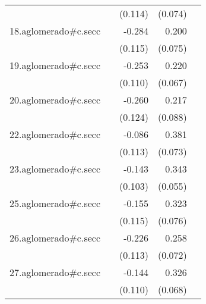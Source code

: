{\begin{longtable}{l*{4}{D{.}{.}{-1}}}
            &                     &     (0.114)         &     (0.074)         &                     \\
\addlinespace
18.aglomerado#c.secc&                     &      -0.284\sym{*}  &       0.200\sym{**} &                     \\
            &                     &     (0.115)         &     (0.075)         &                     \\
\addlinespace
19.aglomerado#c.secc&                     &      -0.253\sym{*}  &       0.220\sym{**} &                     \\
            &                     &     (0.110)         &     (0.067)         &                     \\
\addlinespace
20.aglomerado#c.secc&                     &      -0.260\sym{*}  &       0.217\sym{*}  &                     \\
            &                     &     (0.124)         &     (0.088)         &                     \\
\addlinespace
22.aglomerado#c.secc&                     &      -0.086         &       0.381\sym{***}&                     \\
            &                     &     (0.113)         &     (0.073)         &                     \\
\addlinespace
23.aglomerado#c.secc&                     &      -0.143         &       0.343\sym{***}&                     \\
            &                     &     (0.103)         &     (0.055)         &                     \\
\addlinespace
25.aglomerado#c.secc&                     &      -0.155         &       0.323\sym{***}&                     \\
            &                     &     (0.115)         &     (0.076)         &                     \\
\addlinespace
26.aglomerado#c.secc&                     &      -0.226\sym{*}  &       0.258\sym{***}&                     \\
            &                     &     (0.113)         &     (0.072)         &                     \\
\addlinespace
27.aglomerado#c.secc&                     &      -0.144         &       0.326\sym{***}&                     \\
            &                     &     (0.110)         &     (0.068)         &                     \\

\end{longtable}}
